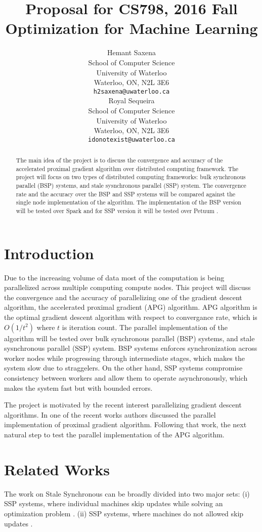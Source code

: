 \documentclass{article}
\title{Proposal for CS798, 2016 Fall\\ \large Optimization for Machine Learning}
\author{
	Hemant Saxena \\
	School of Computer Science\\
	University of Waterloo\\
	Waterloo, ON, N2L 3E6 \\
	\texttt{h2saxena@uwaterloo.ca} \\
	\And
	Royal Sequeira\\
	School of Computer Science\\
	University of Waterloo\\
	Waterloo, ON, N2L 3E6 \\
	\texttt{idonotexist@uwaterloo.ca} \\	
}
\begin{document}
\maketitle

\begin{abstract} 
The main idea of the project is to discuss the convergence and accuracy of the accelerated proximal gradient algorithm \cite{apg} over distributed computing framework.
The project will focus on two types of distributed computing frameworks: bulk synchronous parallel (BSP) systems, and stale sysnchronous parallel (SSP) system.
The convergence rate and the accuracy over the BSP and SSP systems will be compared against the single node implementation of the algorithm.
The implementation of the BSP version will be tested over Spark \cite{spark} and for SSP version it will be tested over Petuum \cite{petuum}.
\end{abstract} 

\section{Introduction}
Due to the increasing volume of data most of the computation is being parallelized across multiple computing compute nodes.
This project will discuss the convergence and the accuracy of parallelizing one of the gradient descent algorithm, the accelerated proximal gradient (APG) algorithm.
APG algorithm is the optimal gradient descent algorithm with respect to convergance rate, which is $O(1/t^2)$ where $t$ is iteration count.
The parallel implementation of the algorithm will be tested over bulk synchronous parallel (BSP) systems, and stale sysnchronous parallel (SSP) system.
BSP systems enforces synchronization across worker nodes while progressing through intermediate stages, which makes the system slow due to straggelers.
On the other hand, SSP systems compromise consistency between workers and allow them to operate asynchronously, which makes the system fast but with bounded errors.

The project is motivated by the recent interest parallelizing gradient descent algorithms.
In one of the recent works \cite{zhou2016convergence} authors discussed the parallel implementation of proximal gradient algorithm.
Following that work, the next natural step to test the parallel implementation of the APG algorithm.

\section{Related Works}
The work on Stale Synchronous can be broadly divided into two major sets: 
(i) SSP systems, where individual machines skip updates while solving an optimization 
problem \cite{feyzmahdavian2014convergence,bertsekas1989convergence,bertsekas1989parallel,tseng1991rate,tsitsiklis1984distributed}. 
(ii) SSP systems, where machines do not allowed skip 
updates \cite{li2014scaling,li2013distributed,li2013parameter,feyzmahdavian2014delayed,ho2013more}.
\end{document}
